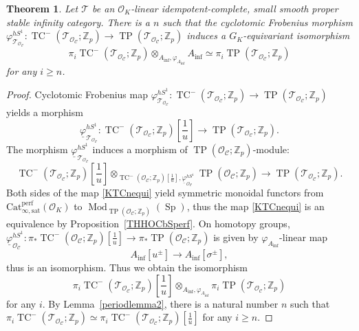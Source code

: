 \documentclass[11pt]{amsart}
\newcommand{\Z}{\mathbb{Z}}
\newcommand{\sO}{\mathcal{O}}
\newcommand{\sT}{\mathcal{T}}
\newcommand{\Mod}{\operatorname{Mod}}
\newcommand{\TP}{\operatorname{TP}}
\newcommand{\TCn}{\operatorname{TC}^{-}}
\newcommand{\Ainf}{A_{\operatorname{inf}}}
\newcommand{\Cu}{\mathcal{C}}
\newcommand{\Catsat}{\operatorname{Cat_{\infty,sat}^{perf}}}
\newcommand{\Sp}{\operatorname{Sp}}
\newtheorem{thm}[lemma]{Theorem}
\theoremstyle{definition}
\theoremstyle{remark}
\numberwithin{equation}{section}
\begin{document}
\begin{thm}\label{TPTCnOCOCcomp}
Let $\sT$ be an $\sO_K$-linear idempotent-complete, small smooth proper stable infinity category. There is a $n$ such that the cyclotomic Frobenius morphism $\varphi^{hS^1}_{\sT_{\sO_\Cu}}:\TCn(\sT_{\sO_\Cu};\Z_p) \to \TP(\sT_{\sO_\Cu};\Z_p)$ induces a $G_K$-equivariant isomorphism
\begin{equation}\label{TCnTPOCAinfequi}
\pi_i\TCn(\sT_{\sO_\Cu};\Z_p)\otimes_{\Ainf,\varphi_{\Ainf}} \Ainf \simeq \pi_i\TP(\sT_{\sO_\Cu};\Z_p)
\end{equation}
for any $i\geq n$. 
\end{thm}
\begin{proof} Cyclotomic Frobenius map $\varphi^{hS^1}_{\sT_{\sO_\Cu}}:\TCn(\sT_{\sO_\Cu};\Z_p) \to \TP(\sT_{\sO_\Cu};\Z_p)$ yields a morphism 
\[
\underline{\varphi}^{hS^1}_{\sT_{\sO_\Cu}}:\TCn(\sT_{\sO_\Cu};\Z_p)[\frac{1}{u}] \to \TP(\sT_{\sO_\Cu};\Z_p).
\]
The morphism $\underline{\varphi}^{hS^1}_{\sT_{\sO_\Cu}}$ induces a morphism of $\TP(\sO_\Cu;\Z_p)$-module: 
  \begin{equation}\label{TCnTPOCequi}
  \TCn(\sT_{\sO_\Cu};\Z_p)[\frac{1}{u}]\otimes_{\TCn(\sO_\Cu;\Z_p)[\frac{1}{u}],\underline{\varphi}^{hS^1}_{\sO_\Cu}} \TP(\sO_\Cu;\Z_p)\to \TP(\sT_{\sO_\Cu};\Z_p).
  \end{equation}
  Both sides of the map \eqref{KTCnequi} yield symmetric monoidal functors from $\Catsat(\sO_K)$ to $\Mod_{\TP(\sO_\Cu;\Z_p)}(\Sp)$, thus the map \eqref{KTCnequi} is an equivalence by Proposition~\ref{THHOCbSperf}. On homotopy groups, $\underline{\varphi}^{hS^1}_{\sO_\Cu}: \pi_*\TCn(\sO_\Cu;\Z_p)[\frac{1}{u}] \to \pi_* \TP(\sO_\Cu;\Z_p)$ is given by $\varphi_{\Ainf}$-linear map
  \[
  \Ainf[u^\pm] \to \Ainf[\sigma^\pm],
  \]
  thus is an isomorphism. Thus we obtain the isomorphism
  \[
  \pi_i \TCn(\sT_{\sO_\Cu};\Z_p)[\frac{1}{u}] \otimes_{\Ainf,\varphi_{\Ainf}} \pi_i \TP(\sT_{\sO_\Cu};\Z_p)
  \]
  for any $i$. By Lemma~\ref{periodlemma2}, there is a natural number $n$ such that $\pi_i \TCn(\sT_{\sO_\Cu};\Z_p)\simeq \pi_i \TCn(\sT_{\sO_\Cu};\Z_p)[\frac{1}{u}]$ for any $i \geq n$.
\end{proof}
\end{document}
